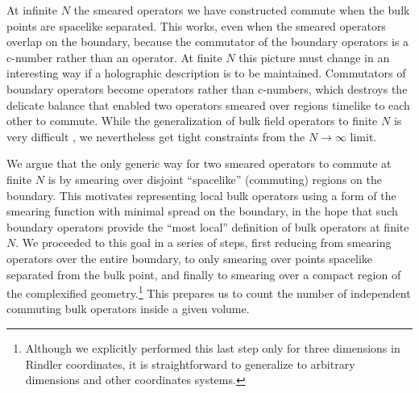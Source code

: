 \documentclass[12pt]{article}
\begin{document}
At infinite $N$ the smeared operators we have constructed commute when
the bulk points are spacelike separated.  This works, even when the
smeared operators overlap on the boundary, because the commutator of
the boundary operators is a c-number rather than an operator.  At
finite $N$ this picture must change in an interesting way if a
holographic description is to be maintained.  Commutators of boundary
operators become operators rather than c-numbers, which destroys the
delicate balance that enabled two operators smeared over regions
timelike to each other to commute. While the generalization of bulk
field operators to finite $N$ is very difficult \cite{Banks:1998dd},
we nevertheless get tight constraints from the $N\rightarrow \infty$
limit.

We argue that the only generic way for two smeared operators to
commute at finite $N$ is by smearing over disjoint ``spacelike''
(commuting) regions on the boundary.  This motivates representing
local bulk operators using a form of the smearing function with
minimal spread on the boundary, in the hope that such boundary
operators provide the ``most local'' definition of bulk operators at
finite $N$.  We proceeded to this goal in a series of steps, first
reducing from smearing operators over the entire boundary, to only
smearing over points spacelike separated from the bulk point, and
finally to smearing over a compact region of the complexified
geometry.\footnote{Although we explicitly performed this last step
only for three dimensions in Rindler coordinates, it is
straightforward to generalize to arbitrary dimensions and other
coordinates systems.}  This prepares us to count the number of
independent commuting bulk operators inside a given volume.
\end{document}
